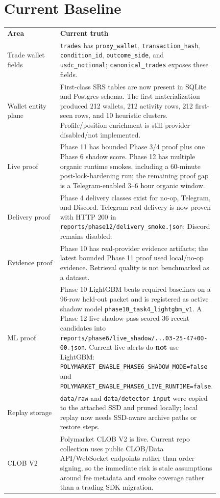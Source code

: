 \documentclass{article}
\begin{document}
\section*{Current Baseline}
\begin{longtable}{p{0.28\linewidth}p{0.58\linewidth}}
\textbf{Area} & \textbf{Current truth} \\
Trade wallet fields & \texttt{trades} has \texttt{proxy\_wallet}, \texttt{transaction\_hash}, \texttt{condition\_id}, \texttt{outcome\_side}, and \texttt{usdc\_notional}; \texttt{canonical\_trades} exposes these fields. \\
Wallet entity plane & First-class SRS tables are now present in SQLite and Postgres schema. The first materialization produced 212 wallets, 212 activity rows, 212 first-seen rows, and 10 heuristic clusters. Profile/position enrichment is still provider-disabled/not implemented. \\
Live proof & Phase 11 has bounded Phase 3/4 proof plus one Phase 6 shadow score. Phase 12 has multiple organic runtime smokes, including a 60-minute post-lock-hardening run; the remaining proof gap is a Telegram-enabled 3--6 hour organic window. \\
Delivery proof & Phase 4 delivery classes exist for no-op, Telegram, and Discord. Telegram real delivery is now proven with HTTP 200 in \texttt{reports/phase12/delivery\_smoke.json}; Discord remains disabled. \\
Evidence proof & Phase 10 has real-provider evidence artifacts; the latest bounded Phase 11 proof used local/no-op evidence. Retrieval quality is not benchmarked as a dataset. \\
ML proof & Phase 10 LightGBM beats required baselines on a 96-row held-out packet and is registered as active shadow model \texttt{phase10\_task4\_lightgbm\_v1}. A Phase 12 live shadow pass scored 36 recent candidates into \texttt{reports/phase6/live\_shadow/...03-25-47+00-00.json}. Current live alerts do \textbf{not} use LightGBM: \texttt{POLYMARKET\_ENABLE\_PHASE6\_SHADOW\_MODE=false} and \texttt{POLYMARKET\_ENABLE\_PHASE6\_LIVE\_RUNTIME=false}. \\
Replay storage & \texttt{data/raw} and \texttt{data/detector\_input} were copied to the attached SSD and pruned locally; local replay now needs SSD-aware archive paths or restore steps. \\
CLOB V2 & Polymarket CLOB V2 is live. Current repo collection uses public CLOB/Data API/WebSocket endpoints rather than order signing, so the immediate risk is stale assumptions around fee metadata and smoke coverage rather than a trading SDK migration. \\
\end{longtable}
\end{document}
